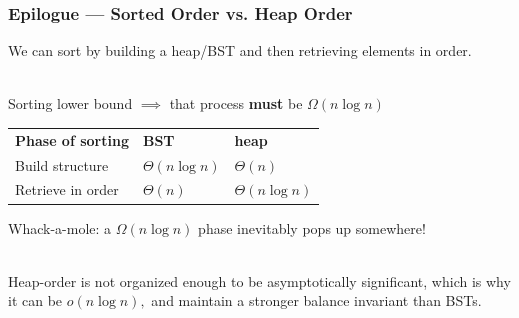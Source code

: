 \documentclass{beamer}
\newcommand{\stanza}{ \\~\ }
\begin{document}
\begin{frame} \frametitle{Epilogue --- Sorted Order vs. Heap Order}
We can sort by building a heap/BST and then retrieving elements in order. \stanza

Sorting lower bound $\implies$ that process \textbf{must} be $\Omega(n \log n)$

\begin{center}
\begin{tabular}{lll}
\textbf{Phase of sorting} & \textbf{BST} & \textbf{heap} \\
Build structure & $\Theta(n \log n)$ & $\Theta(n)$ \\
Retrieve in order & $\Theta(n)$ & $\Theta(n \log n)$ \\
\end{tabular}
\end{center}
Whack-a-mole: a $\Omega(n \log n)$ phase inevitably pops up somewhere! \stanza

Heap-order is not organized enough to be asymptotically significant, which is
 why it can be $o(n \log n),$ and maintain a stronger balance invariant than
 BSTs.

\end{frame}
\end{document}
